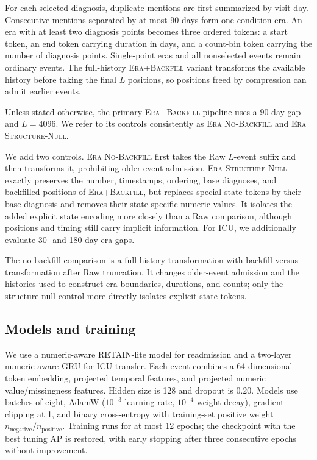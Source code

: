 \documentclass{article}
\begin{document}
For each selected diagnosis, duplicate mentions are first summarized by visit
day. Consecutive mentions separated by at most 90 days form one condition era.
An era with at least two diagnosis points becomes three ordered tokens: a start
token, an end token carrying duration in days, and a count-bin token carrying
the number of diagnosis points. Single-point eras and all nonselected events
remain ordinary events. The full-history \textsc{Era+Backfill} variant transforms
the available history before taking the final $L$ positions, so positions freed
by compression can admit earlier events.

Unless stated otherwise, the primary \textsc{Era+Backfill} pipeline uses a
90-day gap and $L=4096$. We refer to its controls consistently as
\textsc{Era No-Backfill} and \textsc{Era Structure-Null}.

We add two controls. \textsc{Era No-Backfill} first takes the Raw $L$-event
suffix and then transforms it, prohibiting older-event admission.
\textsc{Era Structure-Null} exactly preserves the number, timestamps, ordering,
base diagnoses, and backfilled positions of \textsc{Era+Backfill}, but replaces
special state tokens by their base diagnosis and removes their state-specific
numeric values. It isolates the added explicit state encoding more closely than
a Raw comparison, although positions and timing still carry implicit
information. For ICU, we additionally evaluate 30- and 180-day era gaps.

The no-backfill comparison is a full-history transformation with backfill
versus transformation after Raw truncation. It changes older-event admission
and the histories used to construct era boundaries, durations, and counts;
only the structure-null control more directly isolates explicit state tokens.

\subsection{Models and training}

We use a numeric-aware RETAIN-lite model for readmission and a two-layer
numeric-aware GRU for ICU transfer. Each event combines a 64-dimensional token
embedding, projected temporal features, and projected numeric value/missingness
features. Hidden size is 128 and dropout is 0.20. Models use batches of eight,
AdamW ($10^{-3}$ learning rate, $10^{-4}$ weight decay), gradient clipping at
1, and binary cross-entropy with training-set positive weight
$n_{\mathrm{negative}}/n_{\mathrm{positive}}$. Training runs for at most 12
epochs; the checkpoint with the best tuning AP is restored, with early stopping
after three consecutive epochs without improvement.
\end{document}
